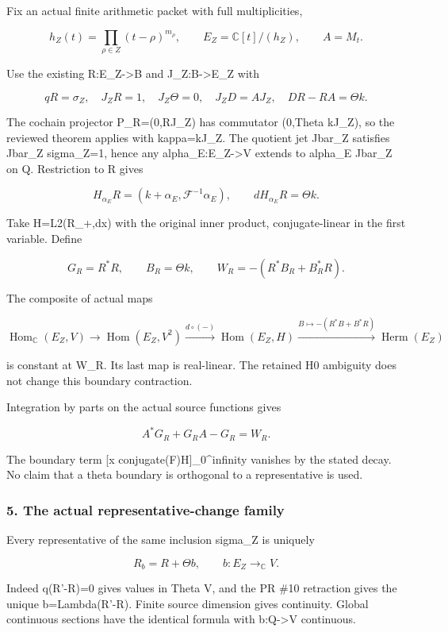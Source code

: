 Fix an actual finite arithmetic packet with full multiplicities,

\[h_Z(t)=\prod_{\rho\in Z}(t-\rho)^{m_\rho},\qquad E_Z=\mathbb C[t]/(h_Z),\qquad A=M_t.\]

Use the existing R:E\_Z-\textgreater B and J\_Z:B-\textgreater E\_Z with

\[qR=\sigma_Z,\quad J_ZR=1,\quad J_Z\Theta=0,\quad J_ZD=AJ_Z,\quad DR-RA=\Theta k.\]

The cochain projector P\_R=(0,RJ\_Z) has commutator (0,Theta kJ\_Z), so the reviewed theorem applies
with kappa=kJ\_Z. The quotient jet Jbar\_Z satisfies Jbar\_Z sigma\_Z=1, hence any
alpha\_E:E\_Z-\textgreater V extends to alpha\_E Jbar\_Z on Q. Restriction to R gives

\[\boxed{H_{\alpha_E}R=(k+\alpha_E,\mathcal F^{-1}\alpha_E),\qquad dH_{\alpha_E}R=\Theta k.}\]

Take H=L2(R\_+,dx) with the original inner product, conjugate-linear in the first variable. Define

\[G_R=R^*R,\qquad B_R=\Theta k,\qquad W_R=-(R^*B_R+B_R^*R).\]

The composite of actual maps

\[\operatorname{Hom}_{\mathbb C}(E_Z,V)\longrightarrow\operatorname{Hom}(E_Z,V^2)\xrightarrow{d\circ(-)}\operatorname{Hom}(E_Z,H)\xrightarrow{B\mapsto-(R^*B+B^*R)}\operatorname{Herm}(E_Z)\]

is constant at W\_R. Its last map is real-linear. The retained H0 ambiguity does not change this
boundary contraction.

Integration by parts on the actual source functions gives

\[\boxed{A^*G_R+G_RA-G_R=W_R.}\]

The boundary term {[}x conjugate(F)H{]}\_0\^{}infinity vanishes by the stated decay. No claim that a
theta boundary is orthogonal to a representative is used.

\subsubsection{5. The actual representative-change
family}\label{pr_11:the-actual-representative-change-family}

Every representative of the same inclusion sigma\_Z is uniquely

\[R_b=R+\Theta b,\qquad b:E_Z\to_{\mathbb C}V.\]

Indeed q(R'-R)=0 gives values in Theta V, and the PR \#10 retraction gives the unique
b=Lambda(R'-R). Finite source dimension gives continuity. Global continuous sections have the
identical formula with b:Q-\textgreater V continuous.


